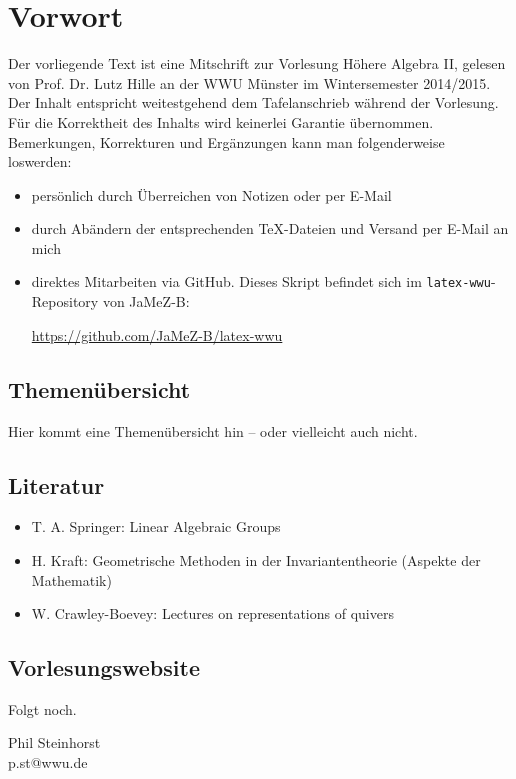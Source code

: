 \section*{Vorwort}
\label{sec:preface}
	Der vorliegende Text ist eine Mitschrift zur Vorlesung Höhere Algebra II, gelesen von Prof. Dr. Lutz Hille an der WWU Münster im Wintersemester 2014/2015. Der Inhalt entspricht weitestgehend dem Tafelanschrieb während der Vorlesung. Für die Korrektheit des Inhalts wird keinerlei Garantie übernommen. Bemerkungen, Korrekturen und Ergänzungen kann man folgenderweise loswerden:
	\begin{itemize}
		\item persönlich durch Überreichen von Notizen oder per E-Mail
		\item durch Abändern der entsprechenden TeX-Dateien und Versand per E-Mail an mich
		\item direktes Mitarbeiten via GitHub. Dieses Skript befindet sich im \texttt{latex-wwu}-Repository von JaMeZ-B:
		\begin{center}
			\url{https://github.com/JaMeZ-B/latex-wwu}
		\end{center}
	\end{itemize}

\subsection*{Themenübersicht}
\label{sub:content}
	Hier kommt eine Themenübersicht hin -- oder vielleicht auch nicht.

\subsection*{Literatur}
\label{sub:lit}
	
\begin{itemize}
	\item T. A. Springer: Linear Algebraic Groups 
	\item H. Kraft: Geometrische Methoden in der Invariantentheorie (Aspekte der Mathematik)
	\item W. Crawley-Boevey: Lectures on representations of quivers
\end{itemize}

\subsection*{Vorlesungswebsite}
\label{sub:link}
	Folgt noch.



\vfill
\begin{flushright}
	Phil Steinhorst \\
	p.st@wwu.de
\end{flushright}
\newpage